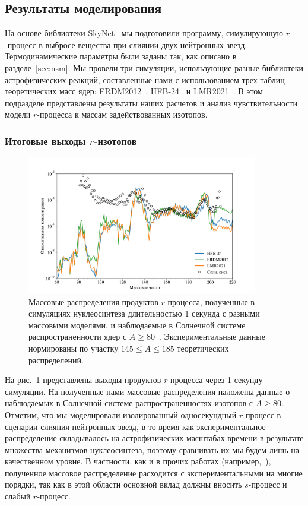 \subsection{Результаты моделирования}
На основе библиотеки SkyNet~\cite{lippuner2017} мы подготовили программу, симулирующую $r$-процесс в выбросе вещества при слиянии двух нейтронных звезд. Термодинамические параметры были заданы так, как описано в разделе~\ref{sec:nsm}. Мы провели три симуляции, использующие разные библиотеки астрофизических реакций, составленные нами с использованием трех таблиц теоретических масс ядер: FRDM2012~\cite{moller2016}, HFB-24~\cite{goriely2013} и LMR2021~\cite{vladimirova2022}. В этом подразделе представлены результаты наших расчетов и анализ чувствительности модели $r$-процесса к массам задействованных изотопов.

\subsubsection{Итоговые выходы $r$-изотопов}

\begin{figure}
\centering
\includegraphics[width=0.9\textwidth]{../pics/distr.pdf}
\caption{Массовые распределения продуктов $r$-процесса, полученные в симуляциях нуклеосинтеза длительностью 1 секунда с разными массовыми моделями, и наблюдаемые в Солнечной системе распространенности ядер с $A \geq 80$~\cite{lodders2003}. Экспериментальные данные нормированы по участку $145 \leq A \leq 185$ теоретических распределений.}
\label{fig:distr}
\end{figure}

На рис.~\ref{fig:distr} представлены выходы продуктов $r$-процесса через 1 секунду симуляции. На полученные нами массовые распределения наложены данные о наблюдаемых в Солнечной системе распространенностях изотопов с $A \geq 80$. Отметим, что мы моделировали изолированный односекундный $r$-процесс в сценарии слияния нейтронных звезд, в то время как экспериментальное распределение складывалось на астрофизических масштабах времени в результате множества механизмов нуклеосинтеза, поэтому сравнивать их мы будем лишь на качественном уровне. В частности, как и в прочих работах (например,~\cite{goriely2011}), полученное массовое распределение расходится с экспериментальными на многие порядки, так как в этой области основной вклад должны вносить $s$-процесс и слабый $r$-процесс.


